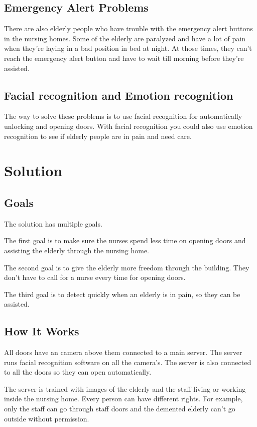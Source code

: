 \documentclass[14pt, a4paper]{extarticle}
\begin{document}
	\subsection{Emergency Alert Problems}
	There are also elderly people who have trouble with the emergency alert buttons in the nursing homes. Some of the elderly are paralyzed and have a lot of pain when they're laying in a bad position in bed at night. At those times, they can't reach the emergency alert button and have to wait till morning before they're assisted.
	
	\subsection{Facial recognition and Emotion recognition}
	The way to solve these problems is to use facial recognition for automatically unlocking and opening doors. With facial recognition you could also use emotion recognition to see if elderly people are in pain and need care. 
	
	\newpage
	\section{Solution}
	\subsection{Goals}
	The solution has multiple goals. 
	
	\vspace{5mm}
	The first goal is to make sure the nurses spend less time on opening doors and assisting the elderly through the nursing home.
	
	
	The second goal is to give the elderly more freedom through the building. They don't have to call for a nurse every time for opening doors.
	
	
	The third goal is to detect quickly when an elderly is in pain, so they can be assisted.
	
	\subsection{How It Works}
	All doors have an camera above them connected to a main server. The server runs facial recognition software on all the camera's. The server is also connected to all the doors so they can open automatically.
	
	
	The server is trained with images of the elderly and the staff living or working inside the nursing home. Every person can have different rights. For example, only the staff can go through staff doors and the demented elderly can't go outside without permission.
	
\end{document}
